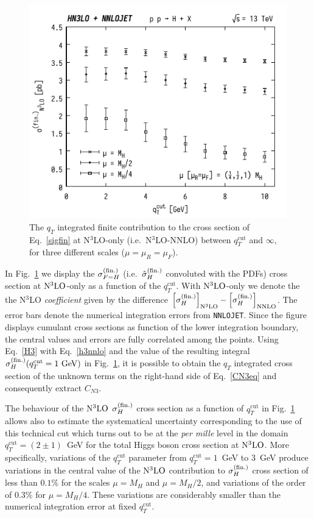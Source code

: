 \documentclass[12pt]{article}
\DeclareRobustCommand{\qt}{q_T}
\DeclareRobustCommand{\qtcut}{\ensuremath{q_T^\mathrm{cut}}}
\begin{document}
\begin{figure}[tb]
\centering
\includegraphics[width=.6\linewidth]{./new_figures/finN3LO}
\caption{\label{fig:finiten3lo}{The $\qt$ integrated finite contribution to the cross section of Eq.~\eqref{sigfin} at N$^{3}$LO-only (i.e.\ N$^{3}$LO-NNLO) between $\qtcut$ and $\infty$, for three different scales ($\mu=\mu_{R}=\mu_{F}$).}}
\end{figure}

In Fig.~\ref{fig:finiten3lo} we display the $\sigma_{F=H}^{(\rm fin.)}$ (i.e.\ ${\hat \sigma}_{H}^{(\rm fin.)}$ convoluted with the PDFs) cross section at $\rm N^3LO$-only as a function of the $\qtcut$. With $\rm N^3LO$-only we denote the the N$^3$LO \emph{coefficient} given by the difference $\Bigl[ \sigma_{H}^{(\rm fin.)}\Bigr]_{\rm N^{3}LO} - \Bigl[ \sigma_{H}^{(\rm fin.)}\Bigr]_{\rm NNLO}$. 
The error bars denote the numerical integration errors from  \texttt{NNLOJET}. Since the figure displays cumulant cross sections as function of the lower integration boundary, the central values and errors are fully correlated among the points.
Using Eq.~\eqref{H3} with Eq.~\eqref{h3nnlo} and the value of the resulting integral $ \sigma_{H}^{(\rm fin.)}(\qtcut=1~{\rm GeV})$ in Fig.~\ref{fig:finiten3lo}, it is possible to obtain the $\qt$ integrated cross section of the unknown terms on the right-hand side of Eq.~\eqref{CN3eq} and consequently extract $C_{N3}$. 

The behaviour of the $\rm N^3LO$ $\sigma_{H}^{(\rm fin.)}$ cross section as a function of $\qtcut$ in Fig.~\ref{fig:finiten3lo} allows also to estimate the systematical uncertainty corresponding to the use of this technical cut which turns out to be at the \textit{per mille} level in the domain $\qtcut=(2\pm 1)$~GeV for the total Higgs boson cross section at $\rm N^3LO$. More specifically, variations of the $\qtcut$ parameter from $\qtcut=1$~GeV to 3~GeV produce variations in the central value of the 
$\rm N^3LO$ contribution to $\sigma_{H}^{(\rm fin.)}$ cross section of less than $0.1\%$ for the scales $\mu=M_{H}$ and $\mu=M_{H}/2$, and variations of the order of $0.3\%$ for $\mu=M_{H}/4$. These variations are considerably smaller than the numerical integration error at fixed $\qtcut$. 
\end{document}
